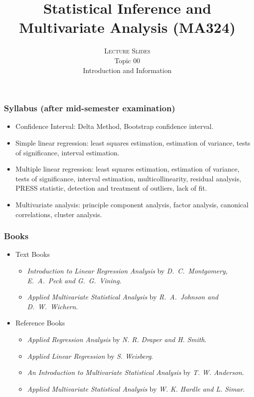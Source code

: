 \documentclass[10pt]{beamer} %
\title[]{Statistical Inference and Multivariate Analysis (MA324)}
\subtitle{\textsc{Lecture Slides}\\ Topic 00 \\
   Introduction and Information
}
\author[MA324]{
}
\date{}
\begin{document}
\thispagestyle{empty}
\maketitle

\begin{frame}
   \frametitle{Syllabus (after mid-semester examination)}
   \begin{itemize}
      \item Confidence Interval: Delta Method, Bootstrap confidence interval.
      \item Simple linear regression: least squares estimation, estimation of
         variance, tests of significance, interval estimation.
      \item Multiple linear regression: least squares estimation, estimation of
         variance, tests of significance, interval estimation,
         multicollinearity, residual analysis, PRESS statistic, detection and
         treatment of outliers, lack of fit.
      \item Multivariate analysis: principle component analysis, factor
         analysis, canonical correlations, cluster analysis.
   \end{itemize}
\end{frame}

\begin{frame}
   \frametitle{Books}
   \begin{itemize}
      \setlength\itemsep{1em}
      \item Text Books
         \begin{itemize}
            \item \textit{Introduction to Linear Regression Analysis} by
               \textit{D.~C.~Montgomery, E.~A.~Peck and G.~G.~Vining}.
            \item \textit{Applied Multivariate Statistical Analysis} by
               \textit{R.~A.~Johnson and D.~W.~Wichern}.
         \end{itemize}
      \item Reference Books
         \begin{itemize}
            \item \textit{Applied Regression Analysis} by \textit{N. R. Draper
               and H. Smith}.
            \item \textit{ Applied Linear Regression} by \textit{S. Weisberg}.
            \item \textit{An Introduction to Multivariate Statistical Analysis}
               by \textit{T. W. Anderson}.
            \item \textit{Applied Multivariate Statistical Analysis} by
               \textit{W. K. Hardle and L. Simar}.
         \end{itemize}
   \end{itemize}
\end{frame}
\end{document}
